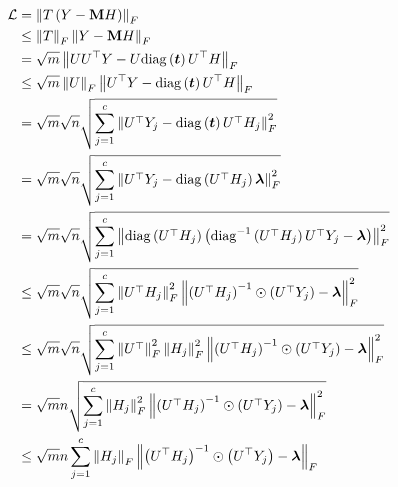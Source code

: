 \documentclass{article} %
\def\vlambda{{\bm\lambda}}
\begin{document}
\begin{equation}
	\begin{aligned}
		\gL&=\left\|T\left(Y-\rmM H\right)\right\|_F\\
		&\leq\left\|T\right\|_F\left\|Y-\rmM H\right\|_F\\
		&=\sqrt{m}\left\|UU^{\top}Y-U\mathrm{diag}\left(\vt\right)U^{\top}H\right\|_F\\
		&\leq\sqrt{m}\left\|U\right\|_F\left\|U^{\top}Y-\mathrm{diag}\left(\vt\right)U^{\top}H\right\|_F\\
		&=\sqrt{m}\sqrt{n}\sqrt{\sum_{j=1}^c\left\|U^{\top}Y_j-\mathrm{diag}\left(\vt\right)U^{\top}H_j\right\|^2_F}\\
		&=\sqrt{m}\sqrt{n}\sqrt{\sum_{j=1}^c\left\|U^{\top}Y_j-\mathrm{diag}\left(U^{\top}H_j\right)\vlambda\right\|^2_F}\\
		&=\sqrt{m}\sqrt{n}\sqrt{\sum_{j=1}^c\left\|\mathrm{diag}\left(U^{\top}H_j\right)\left(\mathrm{diag}^{-1}\left(U^{\top}H_j\right)U^{\top}Y_j-\vlambda\right)\right\|^2_F}\\
		&\leq\sqrt{m}\sqrt{n}\sqrt{\sum_{j=1}^c\left\|U^{\top}H_j\right\|^2_F\left\|\left(U^{\top}H_j\right)^{-1}\odot\left(U^{\top}Y_j\right)-\vlambda\right\|^2_F}\\
		&\leq\sqrt{m}\sqrt{n}\sqrt{\sum_{j=1}^c\left\|U^{\top}\right\|^2_F\left\|H_j\right\|^2_F\left\|\left(U^{\top}H_j\right)^{-1}\odot\left(U^{\top}Y_j\right)-\vlambda\right\|^2_F}\\
		&=\sqrt{m}n\sqrt{\sum_{j=1}^c\left\|H_j\right\|^2_F\left\|\left(U^{\top}H_j\right)^{-1}\odot\left(U^{\top}Y_j\right)-\vlambda\right\|^2_F}\\
		&\leq\sqrt{m}n\sum_{j=1}^c\left\|H_j\right\|_F\left\|\left(U^{\top}H_j\right)^{-1}\odot\left(U^{\top}Y_j\right)-\vlambda\right\|_F
	\end{aligned}
\end{equation}
\end{document}
